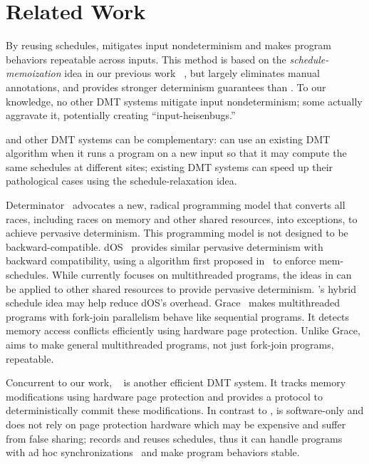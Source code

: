 \section{Related Work} \label{sec:related}

By reusing schedules, \peregrine mitigates input nondeterminism and makes
program behaviors repeatable across inputs.  This method is based on the
\emph{schedule-memoization} idea in our previous work
\tern~\cite{cui:tern:osdi10}, but \peregrine largely eliminates manual annotations,
and provides stronger determinism guarantees than \tern.  To our
knowledge, no other DMT systems mitigate input nondeterminism; some
actually aggravate it, potentially creating ``input-heisenbugs.''

\peregrine and other DMT systems can be complementary: \peregrine can use an
existing DMT algorithm when it runs a program on a new input
so that it may compute the same schedules at different sites;
existing DMT systems can speed up their pathological cases using the
schedule-relaxation idea.

Determinator~\cite{determinator:osdi10}
advocates a new, radical programming model that converts all races,
including races on memory and other shared resources, into exceptions, to
achieve pervasive determinism.  This programming model is not designed to
be backward-compatible.  dOS~\cite{dos:osdi10} provides similar pervasive
determinism with backward compatibility, using a \dmt algorithm first
proposed in~\cite{dmp:asplos09} to enforce mem-schedules.  While \peregrine
currently focuses on multithreaded programs, the ideas in \peregrine can be
applied to other shared resources to provide pervasive determinism.
\peregrine's hybrid schedule idea may help
reduce dOS's overhead.  Grace~\cite{grace:oopsla09} makes multithreaded
programs with fork-join parallelism behave like sequential programs.  It
detects memory access conflicts efficiently using hardware page
protection.  Unlike Grace, \peregrine aims to make general multithreaded
programs, not just fork-join programs, repeatable.  

Concurrent to our work, \dthreads~\cite{dthreads:sosp11} is another
efficient DMT system.  It tracks memory modifications using hardware page
protection and provides a protocol to deterministically commit these
modifications.  In contrast to \dthreads, \peregrine is software-only and does not
rely on page protection hardware which may be expensive and suffer from
false sharing; \peregrine records and reuses schedules, thus it can handle
programs with ad hoc synchronizations~\cite{syncfinder:osdi10} and make
program behaviors stable.

